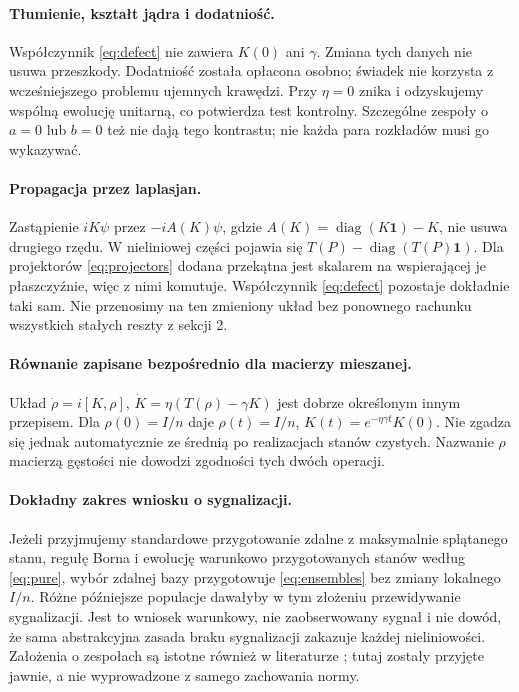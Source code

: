 \documentclass[11pt,a4paper]{article}
\begin{document}
\paragraph{Tłumienie, kształt jądra i dodatniość.}
Współczynnik \eqref{eq:defect} nie zawiera $K(0)$ ani $\gamma$.
Zmiana tych danych nie usuwa przeszkody. Dodatniość została opłacona
osobno; świadek nie korzysta z wcześniejszego problemu ujemnych krawędzi.
Przy $\eta=0$ znika i odzyskujemy wspólną ewolucję unitarną, co
potwierdza test kontrolny. Szczególne zespoły o $a=0$ lub $b=0$ też
nie dają tego kontrastu; nie każda para rozkładów musi go wykazywać.

\paragraph{Propagacja przez laplasjan.}
Zastąpienie $iK\psi$ przez $-iA(K)\psi$, gdzie
$A(K)=\operatorname{diag}(K\mathbf1)-K$, nie usuwa drugiego rzędu.
W nieliniowej części pojawia się $T(P)-\operatorname{diag}(T(P)\mathbf1)$.
Dla projektorów \eqref{eq:projectors} dodana przekątna jest skalarem
na wspierającej je płaszczyźnie, więc z nimi komutuje. Współczynnik
\eqref{eq:defect} pozostaje dokładnie taki sam. Nie przenosimy na ten
zmieniony układ bez ponownego rachunku wszystkich stałych reszty z sekcji 2.

\paragraph{Równanie zapisane bezpośrednio dla macierzy mieszanej.}
Układ $\dot\rho=i[K,\rho]$, $\dot K=\eta(T(\rho)-\gamma K)$ jest
dobrze określonym innym przepisem. Dla $\rho(0)=I/n$ daje
$\rho(t)=I/n$, $K(t)=e^{-\eta\gamma t}K(0)$. Nie zgadza się jednak
automatycznie ze średnią po realizacjach stanów czystych.
Nazwanie $\rho$ macierzą gęstości nie dowodzi zgodności tych dwóch operacji.

\paragraph{Dokładny zakres wniosku o sygnalizacji.}
Jeżeli przyjmujemy standardowe przygotowanie zdalne z maksymalnie
splątanego stanu, regułę Borna i ewolucję warunkowo przygotowanych
stanów według \eqref{eq:pure}, wybór zdalnej bazy przygotowuje
\eqref{eq:ensembles} bez zmiany lokalnego $I/n$. Różne późniejsze
populacje dawałyby w tym złożeniu przewidywanie sygnalizacji.
Jest to wniosek warunkowy, nie zaobserwowany sygnał i nie dowód, że
sama abstrakcyjna zasada braku sygnalizacji zakazuje każdej nieliniowości.
Założenia o zespołach są istotne również w literaturze
\cite{Simon2001,Bona2003}; tutaj zostały przyjęte jawnie, a nie wyprowadzone
z samego zachowania normy.
\end{document}
